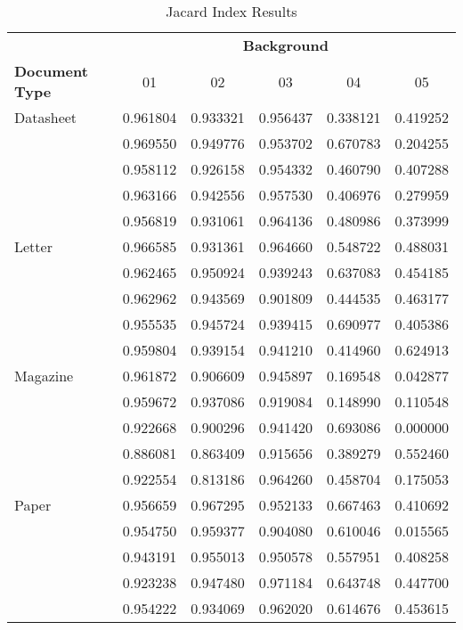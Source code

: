 \documentclass[english, paper=a4]{scrartcl}
\begin{document}
\begin{table*}[]
\centering
\caption{Jacard Index Results}
\label{tax}
\begin{tabular}{l | p{2cm}| p{2cm}| p{2cm}| p{2cm}| p{2cm} }
\hline
& \multicolumn{5}{|c}{\textbf{Background}} \\
\textbf{Document Type} &  \multicolumn{1}{c}{01} & \multicolumn{1}{c}{02} & \multicolumn{1}{c}{03} & \multicolumn{1}{c}{04} &\multicolumn{1}{c}{05} \\ \hline\hline
Datasheet & 0.961804   & 0.933321  &0.956437 &0.338121 &0.419252  \\ 
           &0.969550 & 0.949776  &0.953702 &0.670783 &0.204255  \\ 
           & 0.958112  & 0.926158  &0.954332 &0.460790 &0.407288  \\ 
           & 0.963166  & 0.942556  &0.957530 &0.406976 &0.279959  \\ 
           & 0.956819  & 0.931061  &0.964136 &0.480986 &0.373999  \\ \hline
Letter & 0.966585 & 0.931361  &0.964660 &0.548722 &0.488031  \\    
		& 0.962465 & 0.950924  &0.939243 &0.637083 &0.454185  \\ 
		& 0.962962 & 0.943569  &0.901809 &0.444535 &0.463177  \\ 
		& 0.955535 & 0.945724  &0.939415 &0.690977 &0.405386  \\ 
		& 0.959804 & 0.939154  &0.941210 &0.414960 &0.624913  \\ \hline 
Magazine & 0.961872 & 0.906609  &0.945897 &0.169548 &0.042877  \\   
		& 0.959672 & 0.937086  &0.919084 &0.148990 &0.110548  \\ 
		& 0.922668 & 0.900296  &0.941420 &0.693086 &0.000000  \\ 
		& 0.886081 & 0.863409  &0.915656 &0.389279 &0.552460  \\ 
		& 0.922554 & 0.813186  &0.964260 &0.458704 &0.175053  \\ \hline 	
Paper & 0.956659 & 0.967295  &0.952133 &0.667463 &0.410692  \\   
		& 0.954750 & 0.959377  &0.904080 &0.610046 &0.015565  \\ 
		& 0.943191 & 0.955013  &0.950578 &0.557951 &0.408258  \\ 
		& 0.923238 & 0.947480  &0.971184 &0.643748 &0.447700  \\ 
		& 0.954222 & 0.934069  &0.962020 &0.614676 &0.453615  \\ \hline 	

\end{tabular}
\end{table*}
\end{document}
